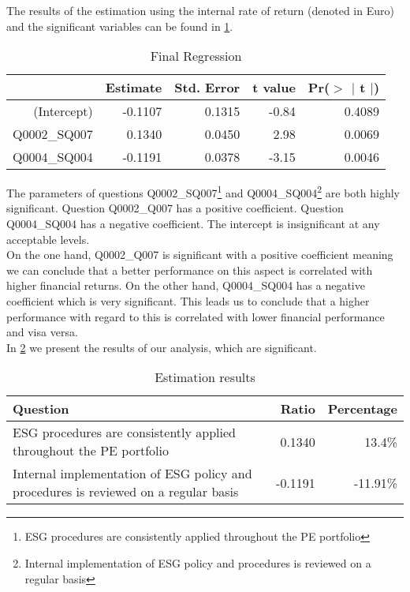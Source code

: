 \documentclass[twoside,12pt]{article}
\let\oldmarginpar\marginpar
\renewcommand\marginpar[1]{\-\oldmarginpar[\raggedleft\footnotesize #1]
{\raggedright\footnotesize #1}}
\begin{document}
The results of the estimation using the internal rate of return (denoted in Euro) and the significant variables can be found in  \cref{tab:fin}.

\begin{table}[!hb]
\centering
\caption{Final Regression}
\label{tab:fin}
\begin{tabular}{rrrrr}
  \hline
 & Estimate & Std. Error & t value & Pr($>$ $|$ t $ | $) \\ 
  \hline
(Intercept) & -0.1107 & 0.1315 & -0.84 & 0.4089 \\ 
  Q0002\_SQ007 & 0.1340 & 0.0450 & 2.98 & 0.0069 \\ 
  Q0004\_SQ004 & -0.1191 & 0.0378 & -3.15 & 0.0046 \\ 
   \hline
\end{tabular}
\end{table}


\marginpar{significance}The parameters of questions Q0002\_SQ007\footnote{ESG procedures are consistently applied throughout the PE portfolio} and Q0004\_SQ004\footnote{Internal implementation of ESG policy and procedures is reviewed on a regular basis} are both highly significant. Question Q0002\_Q007 has a positive coefficient. Question Q0004\_SQ004 has a negative coefficient. The intercept is insignificant at any acceptable levels.\\

On the one hand, Q0002\_Q007 is significant with a positive coefficient meaning we can conclude that a better performance on this aspect is correlated with higher financial returns. On the other hand, Q0004\_SQ004 has a negative coefficient which is very significant. This leads us to conclude that a higher performance with regard to this is correlated with lower financial performance and visa versa.\\

In \cref{tab:results} we present the results of our analysis, which are significant.

\begin{table}[!h]
\begin{center}
\caption{Estimation results}
\label{tab:results}
\begin{tabular}{p{8cm}rr}
Question & Ratio & Percentage\\
\hline
ESG procedures are consistently applied throughout the PE portfolio & 0.1340 & 13.4\% \\
Internal implementation of ESG policy and procedures is reviewed on a regular basis & -0.1191 & -11.91\% \\
\end{tabular}
\end{center}
\end{table}
\end{document}
